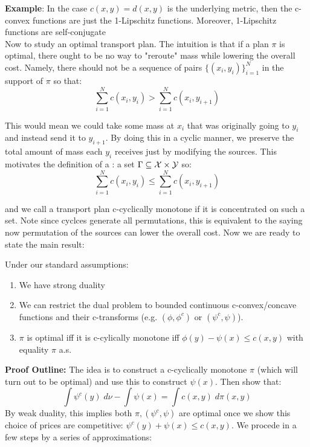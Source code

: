 \noindent \textbf{Example}: In the case $c(x,y) = d(x,y)$ is the underlying metric, then the c-convex functions are just the 1-Lipschitz functions. Moreover, 1-Lipschitz functions are self-conjugate\\

\noindent Now to study an optimal transport plan. The intuition is that if a plan $\pi$ is optimal, there ought to be no way to "reroute" mass while lowering the overall cost. Namely, there should not be a sequence of pairs $\{(x_i, y_i)\}_{i=1}^N$ in the support of $\pi$ so that:
%
\[\sum_{i=1}^N c(x_i,y_i) > \sum_{i=1}^N c(x_i, y_{i+1})\]

\noindent This would mean we could take some mass at $x_i$ that was originally going to $y_i$ and instead send it to $y_{i+1}$. By doing this in a cyclic manner, we preserve the total amount of mass each $y_i$ receives just by modifying the sources. This motivates the definition of a : a set $\Gamma \subseteq {\mathcal X} \times {\mathcal Y}$ so:
\begin{equation}
   \sum_{i=1}^N c(x_i,y_i) \leq \sum_{i=1}^N c(x_i, y_{i+1})
   \label{eqn:c-cyclically_monotone}
\end{equation}

\noindent and we call a transport plan c-cyclically monotone if it is concentrated on such a set. Note since cyclces generate all permutations, this is equivalent to the saying now permutation of the sources can lower the overall cost. Now we are ready to state the main result:

\begin{thm} Under our standard assumptions:
    \begin{enumerate}
    \item We have strong duality
    
    \item We can restrict the dual problem to bounded continuous c-convex/concave functions and their c-transforms (e.g. $(\phi, \phi^c) $ or $(\psi^c, \psi)$).
    
    \item $\pi$ is optimal iff it is c-cylically monotone iff $\phi(y) - \psi(x) \leq c(x,y)$ with equality $\pi$ a.s.
\end{enumerate}

\label{thm:kantorovich_duality}
\end{thm}

\noindent \textbf{Proof Outline:} The idea is to construct a c-cyclically monotone $\pi$ (which will turn out to be optimal) and use this to construct $\psi(x)$. Then show that:
%
\[\int \psi^c(y) \; d\nu - \int \psi(x) = \int c(x,y) \; d\pi(x,y)\]
%
\noindent By weak duality, this implies both $\pi, (\psi^c, \psi)$ are optimal once we show this choice of prices are competitive: $\psi^c(y) + \psi(x) \leq c(x,y)$. We procede in a few steps by a series of approximations:

